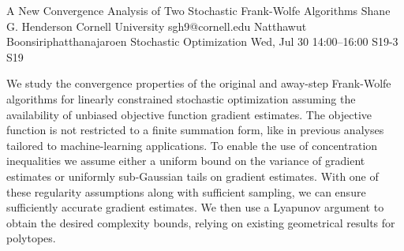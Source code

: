 \begin{talk}
  {A New Convergence Analysis of Two Stochastic Frank-Wolfe Algorithms}%
  {Shane G. Henderson}%
  {Cornell University}%
  {sgh9@cornell.edu}%
  {Natthawut Boonsiriphatthanajaroen}%
  {Stochastic Optimization}%
  {Wed, Jul 30 14:00–16:00}%
  {S19-3}%
  {S19}%
				
			
We study the convergence properties of the original and away-step
Frank-Wolfe algorithms for linearly constrained stochastic
optimization assuming the availability of unbiased objective function
gradient estimates. The objective function is not restricted to a
finite summation form, like in previous analyses tailored to
machine-learning applications. To enable the use of concentration
inequalities we assume either a uniform bound on the variance of
gradient estimates or uniformly sub-Gaussian tails on gradient
estimates. With one of these regularity assumptions along with
sufficient sampling, we can ensure sufficiently accurate gradient
estimates. We then use a Lyapunov argument to obtain the desired
complexity bounds, relying on existing geometrical results for
polytopes. 
\end{talk}


